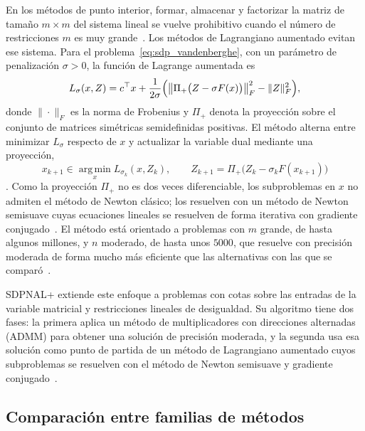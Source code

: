 En los métodos de punto interior, formar, almacenar y factorizar la matriz de tamaño $m \times m$
del sistema lineal se vuelve prohibitivo cuando el número de restricciones $m$ es muy
grande~\parencite[p.~1738]{zhaoNewtonCGAugmentedLagrangian2010a}. Los métodos de Lagrangiano
aumentado evitan ese sistema. Para el problema~\eqref{eq:sdp_vandenberghe}, con un parámetro de
penalización $\sigma > 0$, la función de Lagrange aumentada es
\[
    L_\sigma(x, Z) = c^\top x + \frac{1}{2\sigma}\Bigl(
    \bigl\|\Pi_{+}\bigl(Z - \sigma F(x)\bigr)\bigr\|_F^2 - \|Z\|_F^2 \Bigr),
\]
donde $\|\cdot\|_F$ es la norma de Frobenius y $\Pi_{+}$ denota la proyección sobre el conjunto de
matrices simétricas semidefinidas positivas. El método alterna entre minimizar $L_\sigma$ respecto
de $x$ y actualizar la variable dual mediante una proyección,
\[
    x_{k+1} \in \operatorname*{arg\,min}_{x} L_{\sigma_k}(x, Z_k), \qquad
    Z_{k+1} = \Pi_{+}\bigl(Z_k - \sigma_k F(x_{k+1})\bigr)
\]
\parencite[pp.~1737--1738]{zhaoNewtonCGAugmentedLagrangian2010a}. Como la proyección $\Pi_{+}$
no es dos veces diferenciable, los subproblemas en $x$ no admiten el método de Newton clásico;
\textcite{zhaoNewtonCGAugmentedLagrangian2010a} los resuelven con un método de Newton semisuave
cuyas ecuaciones lineales se resuelven de forma iterativa con gradiente
conjugado~\parencite[p.~1739]{zhaoNewtonCGAugmentedLagrangian2010a}. El
método está orientado a problemas con $m$ grande, de hasta algunos millones, y $n$ moderado, de
hasta unos $5000$, que resuelve con precisión moderada de forma mucho más eficiente que las
alternativas con las que se comparó~\parencite[pp.~1738--1739]{zhaoNewtonCGAugmentedLagrangian2010a}.

SDPNAL+ extiende este enfoque a problemas con cotas sobre las entradas de la variable matricial y
restricciones lineales de desigualdad. Su algoritmo tiene dos fases: la primera aplica un método
de multiplicadores con direcciones alternadas (ADMM) para obtener una solución de precisión
moderada, y la segunda usa esa solución como punto de partida de un método de Lagrangiano
aumentado cuyos subproblemas se resuelven con el método de Newton semisuave y gradiente
conjugado~\parencite[p.~3]{sunSDPNALMatlabSoftware2019}.

\subsection{Comparación entre familias de métodos}
\label{subsec:sdp_comparacion_metodos}

